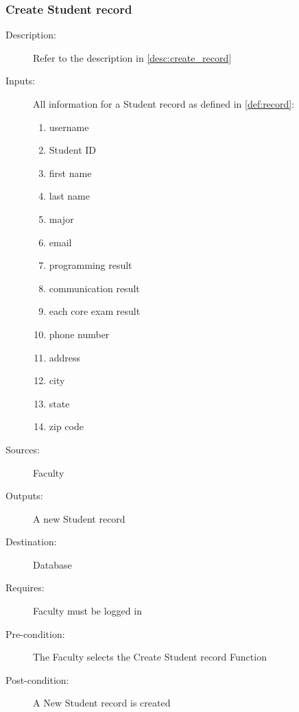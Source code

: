 \subsubsection{\large Create Student record} 
\begin{boxed} %
\begin{description}
\item[Description:]
   Refer to the description in \autoref{desc:create_record}
\item[Inputs:]
   All information for a Student record as defined in \autoref{def:record}:
   \begin{enumerate}
      \item username
      \item Student ID
      \item first name
      \item last name
      \item major
      \item email
      \item programming result
      \item communication result
      \item each core exam result
      \item phone number
      \item address
      \item city
      \item state
      \item zip code
   \end{enumerate}
\item[Sources:]
   Faculty
\item[Outputs:]
   A new Student record
\item[Destination:]
   Database
\item[Requires:]
   Faculty must be logged in
\item[Pre-condition:]
   The Faculty selects the Create Student record Function
\item[Post-condition:]
   A New Student record is created
\end{description}
\end{boxed} %

